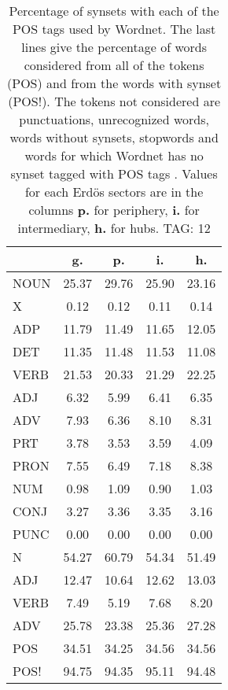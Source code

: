 \begin{table}[h!]
\begin{center}
\begin{tabular}{| l || c | c | c | c |}\hline
 & {\bf g.} & {\bf p.} & {\bf i.} & {\bf h.} \\\hline\hline
NOUN & 25.37  & 29.76  & 25.90  & 23.16 \\
X & 0.12  & 0.12  & 0.11  & 0.14 \\\hline
ADP & 11.79  & 11.49  & 11.65  & 12.05 \\
DET & 11.35  & 11.48  & 11.53  & 11.08 \\\hline
VERB & 21.53  & 20.33  & 21.29  & 22.25 \\\hline
ADJ & 6.32  & 5.99  & 6.41  & 6.35 \\
ADV & 7.93  & 6.36  & 8.10  & 8.31 \\\hline
PRT & 3.78  & 3.53  & 3.59  & 4.09 \\
PRON & 7.55  & 6.49  & 7.18  & 8.38 \\
NUM & 0.98  & 1.09  & 0.90  & 1.03 \\
CONJ & 3.27  & 3.36  & 3.35  & 3.16 \\
PUNC & 0.00  & 0.00  & 0.00  & 0.00 \\\hline\hline\hline
N & 54.27  & 60.79  & 54.34  & 51.49 \\\hline
ADJ & 12.47  & 10.64  & 12.62  & 13.03 \\\hline
VERB & 7.49  & 5.19  & 7.68  & 8.20 \\\hline
ADV & 25.78  & 23.38  & 25.36  & 27.28 \\\hline\hline
POS & 34.51  & 34.25  & 34.56  & 34.56 \\\hline
POS! & 94.75  & 94.35  & 95.11  & 94.48 \\\hline
\end{tabular}
\caption{Percentage of synsets with each of the POS tags used by Wordnet. The last lines give the percentage of words considered from all of the tokens (POS) and from the words with synset (POS!). The tokens not considered are punctuations, unrecognized words, words without synsets, stopwords and words for which Wordnet has no synset  tagged with POS tags . Values for each Erd\"os sectors are in the columns {{\bf p.}} for periphery, {{\bf i.}} for intermediary, {{\bf h.}} for hubs. TAG: 12}
\end{center}
\end{table}